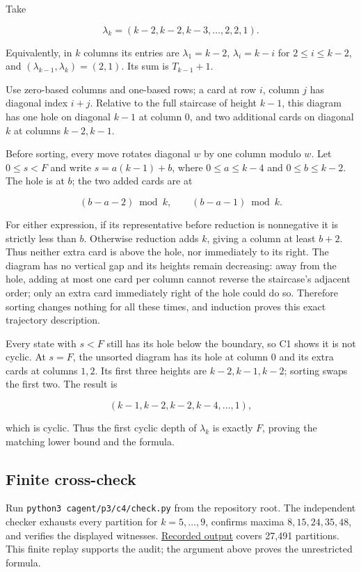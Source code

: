 \documentclass[11pt,a4paper]{article}
\begin{document}
Take

\[
\lambda_k=(k-2,k-2,k-3,\ldots,2,2,1).
\]

Equivalently, in \(k\) columns its entries are \(\lambda_1=k-2\), \(\lambda_i=k-i\) for \(2\le i\le k-2\), and \((\lambda_{k-1},\lambda_k)=(2,1)\). Its sum is \(T_{k-1}+1\).

Use zero-based columns and one-based rows; a card at row \(i\), column \(j\) has diagonal index \(i+j\). Relative to the full staircase of height \(k-1\), this diagram has one hole on diagonal \(k-1\) at column \(0\), and two additional cards on diagonal \(k\) at columns \(k-2,k-1\).

Before sorting, every move rotates diagonal \(w\) by one column modulo \(w\). Let \(0\le s<F\) and write \(s=a(k-1)+b\), where \(0\le a\le k-4\) and \(0\le b\le k-2\). The hole is at \(b\); the two added cards are at

\[
(b-a-2)\bmod k,\qquad (b-a-1)\bmod k.
\]

For either expression, if its representative before reduction is nonnegative it is strictly less than \(b\). Otherwise reduction adds \(k\), giving a column at least \(b+2\). Thus neither extra card is above the hole, nor immediately to its right. The diagram has no vertical gap and its heights remain decreasing: away from the hole, adding at most one card per column cannot reverse the staircase's adjacent order; only an extra card immediately right of the hole could do so. Therefore sorting changes nothing for all these times, and induction proves this exact trajectory description.

Every state with \(s<F\) still has its hole below the boundary, so C1 shows it is not cyclic. At \(s=F\), the unsorted diagram has its hole at column \(0\) and its extra cards at columns \(1,2\). Its first three heights are \(k-2,k-1,k-2\); sorting swaps the first two. The result is

\[
(k-1,k-2,k-2,k-4,\ldots,1),
\]

which is cyclic. Thus the first cyclic depth of \(\lambda_k\) is exactly \(F\), proving the matching lower bound and the formula.

\subsection{Finite cross-check}\label{finite-cross-check}

Run \texttt{python3\ cagent/p3/c4/check.py} from the repository root. The independent checker exhausts every partition for \(k=5,\ldots,9\), confirms maxima \(8,15,24,35,48\), and verifies the displayed witnesses. \href{https://github.com/mpelteshki/climbing-to-the-frontier/blob/212bba53b1818c08c40b8c4b48f636651eaf6410/cagent/p3/c4/finite-check.json}{Recorded output} covers 27,491 partitions. This finite replay supports the audit; the argument above proves the unrestricted formula.
\end{document}
